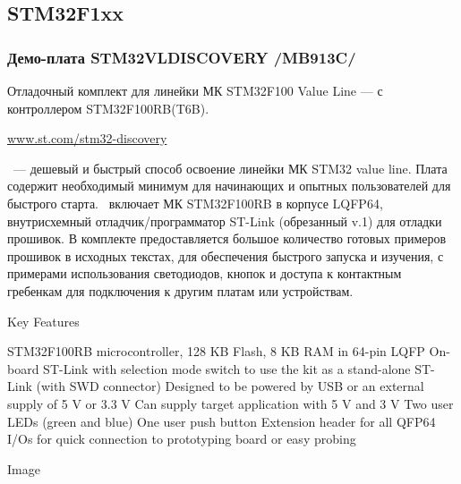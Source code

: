 \subsection{STM32F1xx} 

\subsubsection{Демо-плата STM32VLDISCOVERY /MB913C/}

Отладочный комплект для линейки МК STM32F100 Value Line
--- с контроллером STM32F100RB(T6B).

\url{www.st.com/stm32-discovery}

\vld\ --- дешевый и быстрый способ освоение линейки МК STM32 
value line. 
Плата содержит необходимый минимум для начинающих и опытных пользователей
для быстрого старта.
\vld\ включает МК STM32F100RB в корпусе LQFP64, внутрисхемный 
отладчик/программатор ST-Link (обрезанный v.1) для отладки прошивок.
В комплекте предоставляется большое количество готовых примеров прошивок
в исходных текстах, для обеспечения быстрого запуска и изучения, с примерами
использования светодиодов, кнопок и доступа к контактным гребенкам
для подключения к другим платам или устройствам.

Key Features

    STM32F100RB microcontroller, 128 KB Flash, 8 KB RAM in 64-pin LQFP
    On-board ST-Link with selection mode switch to use the kit as a stand-alone ST-Link (with SWD connector)
    Designed to be powered by USB or an external supply of 5 V or 3.3 V
    Can supply target application with 5 V and 3 V
    Two user LEDs (green and blue)
    One user push button
    Extension header for all QFP64 I/Os for quick connection to prototyping board or easy probing

Image
